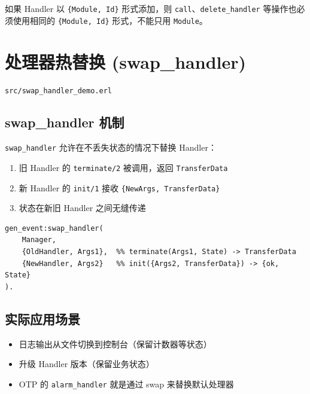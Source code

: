 \documentclass[a4paper,11pt]{article}
\begin{document}
\begin{warnbox}
如果 Handler 以 \texttt{\{Module, Id\}} 形式添加，则 \texttt{call}、\texttt{delete\_handler} 等操作也必须使用相同的 \texttt{\{Module, Id\}} 形式，不能只用 \texttt{Module}。
\end{warnbox}


\section{处理器热替换 (swap\_handler)}

\begin{notebox}[源码文件]
\texttt{src/swap\_handler\_demo.erl}
\end{notebox}

\subsection{swap\_handler 机制}

\texttt{swap\_handler} 允许在不丢失状态的情况下替换 Handler：

\begin{enumerate}[leftmargin=2em]
    \item 旧 Handler 的 \texttt{terminate/2} 被调用，返回 \texttt{TransferData}
    \item 新 Handler 的 \texttt{init/1} 接收 \texttt{\{NewArgs, TransferData\}}
    \item 状态在新旧 Handler 之间无缝传递
\end{enumerate}

\begin{lstlisting}[style=erlangstyle]
%% Swap: old handler -> new handler
gen_event:swap_handler(
    Manager,
    {OldHandler, Args1},  %% terminate(Args1, State) -> TransferData
    {NewHandler, Args2}   %% init({Args2, TransferData}) -> {ok, State}
).
\end{lstlisting}

\subsection{实际应用场景}

\begin{itemize}[leftmargin=2em]
    \item 日志输出从文件切换到控制台（保留计数器等状态）
    \item 升级 Handler 版本（保留业务状态）
    \item OTP 的 \texttt{alarm\_handler} 就是通过 swap 来替换默认处理器
\end{itemize}
\end{document}
